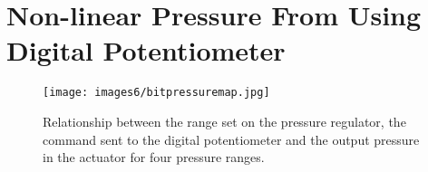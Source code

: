 \appendix

\chapter{Non-linear Pressure From Using Digital Potentiometer}
\label{appendix:A}

\begin{figure}[ht]
    \centering
    \texttt{[image: images6/bitpressuremap.jpg]}
    \caption{Relationship between the range set on the pressure regulator, the command sent to the digital potentiometer and the output pressure in the actuator for four pressure ranges.}
\end{figure}

